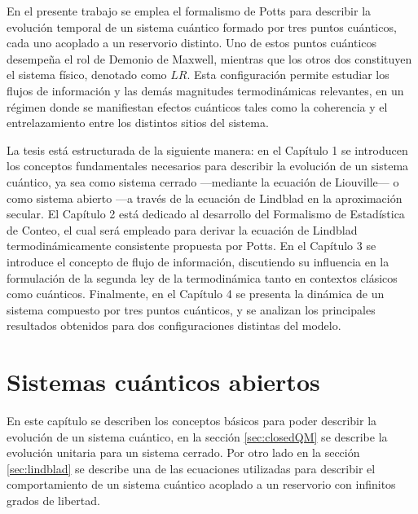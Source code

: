 En el presente trabajo se emplea el formalismo de Potts para describir la evolución temporal de un sistema cuántico formado por tres puntos cuánticos, cada uno acoplado a un reservorio distinto. Uno de estos puntos cuánticos desempeña el rol de Demonio de Maxwell, mientras que los otros dos constituyen el sistema físico, denotado como $LR$. Esta configuración permite estudiar los flujos de información y las demás magnitudes termodinámicas relevantes, en un régimen donde se manifiestan efectos cuánticos tales como la coherencia y el entrelazamiento entre los distintos sitios del sistema.

La tesis está estructurada de la siguiente manera: en el Capítulo 1 se introducen los conceptos fundamentales necesarios para describir la evolución de un sistema cuántico, ya sea como sistema cerrado —mediante la ecuación de Liouville— o como sistema abierto —a través de la ecuación de Lindblad en la aproximación secular. El Capítulo 2 está dedicado al desarrollo del Formalismo de Estadística de Conteo, el cual será empleado para derivar la ecuación de Lindblad termodinámicamente consistente propuesta por Potts. En el Capítulo 3 se introduce el concepto de flujo de información, discutiendo su influencia en la formulación de la segunda ley de la termodinámica tanto en contextos clásicos como cuánticos. Finalmente, en el Capítulo 4 se presenta la dinámica de un sistema compuesto por tres puntos cuánticos, y se analizan los principales resultados obtenidos para dos configuraciones distintas del modelo.







\chapter{Sistemas cuánticos abiertos}

En este capítulo se describen los conceptos básicos para poder describir la evolución de un sistema cuántico, en la sección \ref{sec:closedQM} se describe la evolución unitaria para un sistema cerrado.  Por otro lado en la sección \ref{sec:lindblad} se describe una de las ecuaciones utilizadas para describir el comportamiento de un sistema cuántico acoplado a un reservorio con infinitos grados de libertad.


